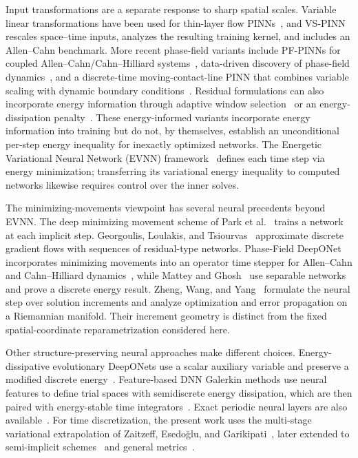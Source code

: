 \documentclass[11pt,letterpaper]{article}
\theoremstyle{plain}
\theoremstyle{definition}
\begin{document}
Input transformations are a separate response to sharp spatial scales. Variable linear transformations have been used for thin-layer flow PINNs~\cite{Wu2024VLTPINN}, and VS-PINN~\cite{Ko2025VSPINN} rescales space--time inputs, analyzes the resulting training kernel, and includes an Allen--Cahn benchmark. More recent phase-field variants include PF-PINNs for coupled Allen--Cahn/Cahn--Hilliard systems~\cite{Chen2025PFPINNs}, data-driven discovery of phase-field dynamics~\cite{Katbar2025DataDriven}, and a discrete-time moving-contact-line PINN that combines variable scaling with dynamic boundary conditions~\cite{Chen2026MCLPINN}. Residual formulations can also incorporate energy information through adaptive window selection~\cite{Guo2024AdaptiveEnergyPINN} or an energy-dissipation penalty~\cite{Kutuk2025EnergyPINN}. These energy-informed variants incorporate energy information into training but do not, by themselves, establish an unconditional per-step energy inequality for inexactly optimized networks. The Energetic Variational Neural Network (EVNN) framework~\cite{Hu2024EVNN} defines each time step via energy minimization; transferring its variational energy inequality to computed networks likewise requires control over the inner solves.

The minimizing-movements viewpoint has several neural precedents beyond EVNN. The deep minimizing movement scheme of Park et al.~\cite{Park2023DMM} trains a network at each implicit step. Georgoulis, Loulakis, and Tsiourvas~\cite{Georgoulis2023Discrete} approximate discrete gradient flows with sequences of residual-type networks. Phase-Field DeepONet incorporates minimizing movements into an operator time stepper for Allen--Cahn and Cahn--Hilliard dynamics~\cite{Li2023PhaseFieldDeepONet}, while Mattey and Ghosh~\cite{Mattey2025SNN} use separable networks and prove a discrete energy result. Zheng, Wang, and Yang~\cite{Zheng2026Increment} formulate the neural step over solution increments and analyze optimization and error propagation on a Riemannian manifold. Their increment geometry is distinct from the fixed spatial-coordinate reparametrization considered here.

Other structure-preserving neural approaches make different choices. Energy-dissipative evolutionary DeepONets use a scalar auxiliary variable and preserve a modified discrete energy~\cite{Zhang2024EnergyDeepONet}. Feature-based DNN Galerkin methods use neural features to define trial spaces with semidiscrete energy dissipation, which are then paired with energy-stable time integrators~\cite{Tang2026DNNG}. Exact periodic neural layers are also available~\cite{DongNi2021Periodic}. For time discretization, the present work uses the multi-stage variational extrapolation of Zaitzeff, Esedo\u{g}lu, and Garikipati~\cite{Zaitzeff2020}, later extended to semi-implicit schemes~\cite{Zaitzeff2021} and general metrics~\cite{Han2023Metric}.
\end{document}
